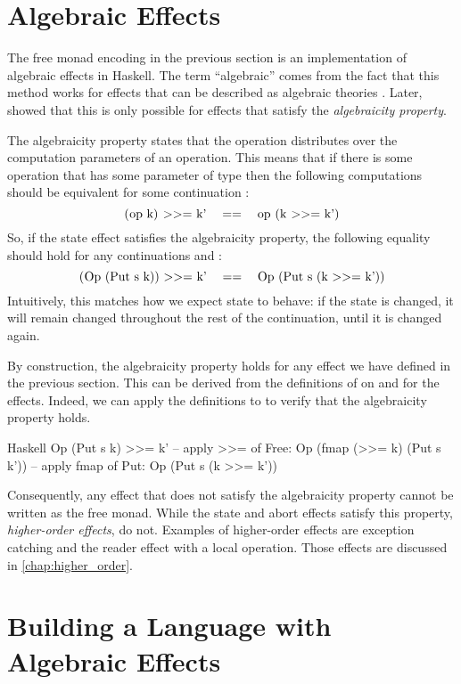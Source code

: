 \section{Algebraic Effects}

The free monad encoding in the previous section is an implementation of algebraic effects in Haskell. The term ``algebraic'' comes from the fact that this method works for effects that can be described as algebraic theories \autocite{goos_adequacy_2001}. Later, \textcite{plotkin_algebraic_2003} showed that this is only possible for effects that satisfy the \emph{algebraicity property}.

The algebraicity property states that the \hs{>>=} operation distributes over the computation parameters of an operation. This means that if there is some operation  that has some parameter of type  then the following computations should be equivalent for some continuation :
\[ \mcode{(op k) >>= k'}\quad==\quad\mcode{op (k >>= k')} \]
So, if the state effect satisfies the algebraicity property, the following equality should hold for any continuations  and :
\[ \mcode{(Op (Put s k)) >>= k'}\quad==\quad\mcode{Op (Put s (k >>= k'))} \]
Intuitively, this matches how we expect state to behave: if the state is changed, it will remain changed throughout the rest of the continuation, until it is changed again.

By construction, the algebraicity property holds for any effect we have defined in the previous section. This can be derived from the definitions of \hs{>>=} on  and  for the effects. Indeed, we can apply the definitions to  to verify that the algebraicity property holds.

\begin{lst}{Haskell}
Op (Put s k) >>= k'
-- apply >>= of Free:
Op (fmap (>>= k) (Put s k'))
-- apply fmap of Put:
Op (Put s (k >>= k'))
\end{lst}
%
Consequently, any effect that does not satisfy the algebraicity property cannot be written as the free monad. While the state and abort effects satisfy this property, \emph{higher-order effects}, do not. Examples of higher-order effects are exception catching and the reader effect with a local operation. Those effects are discussed in \cref{chap:higher_order}.

\section{Building a Language with Algebraic Effects}

